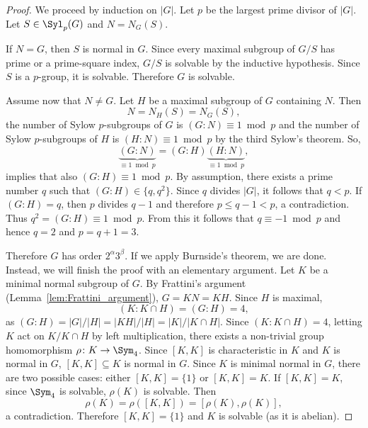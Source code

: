 \begin{proof}
We proceed by induction on $|G|$. Let $p$ be the largest prime divisor of $|G|$. Let 
$S\in\Syl_p(G)$ and $N=N_G(S)$. 

If $N=G$, then $S$ is normal in $G$. Since every 
maximal subgroup of $G/S$ has prime or a prime-square index, 
$G/S$ is solvable by the inductive hypothesis. Since $S$ is a $p$-group, it is solvable. 
Therefore $G$ is solvable. 

Assume now that $N\ne G$. Let $H$ be a maximal subgroup of $G$ containing $N$. Then 
\[
N=N_H(S)=N_G(S),
\]
the number of Sylow $p$-subgroups of $G$ is $(G:N)\equiv1\bmod p$  
and the number of Sylow $p$-subgroups of $H$ is $(H:N)\equiv1\bmod p$ 
by the third Sylow's theorem. So,
\[
\underbrace{(G:N)}_{\equiv1\bmod p} = (G:H)\underbrace{(H:N)}_{\equiv1\bmod p},
\]
implies that also $(G:H)\equiv1\bmod p$.
By assumption, there exists a prime number $q$ 
such that 
$(G:H)\in\{q,q^2\}$. Since $q$ divides $|G|$, it follows that $q<p$. If $(G:H)=q$, then 
$p$ divides $q-1$ and therefore $p\leq q-1<p$, a contradiction. Thus $q^2=(G:H)\equiv 1\bmod p$.
From this it follows that $q\equiv -1\bmod p$ and hence $q=2$ and 
$p=q+1=3$. 

Therefore $G$ has order $2^\alpha 3^ \beta$. 
If we apply Burnside's theorem, we are done. Instead, we will finish the proof with an elementary argument. Let $K$ be a minimal normal subgroup of $G$.
By Frattini's argument (Lemma~\ref{lem:Frattini_argument}),  $G=KN=KH$. Since $H$ is maximal, 
\[
(K:K\cap H) = (G:H)=4, 
\]
as $(G:H)=|G|/|H|=|KH|/|H|=|K|/|K\cap H|$. 
Since $(K:K\cap H)=4$, letting $K$ act on $K/K\cap H$ by left multiplication, there exists 
a non-trivial group homomorphism $\rho\colon K\to\Sym_4$. Since $[K,K]$ is characteristic in $K$ and $K$ is normal in $G$, $[K,K]\subseteq K$ is normal in $G$. Since $K$ is minimal normal in $G$, 
there are two possible cases: either $[K,K]=\{1\}$ or 
$[K,K]=K$. If $[K,K]=K$, 
since $\Sym_4$ is solvable, $\rho(K)$ is solvable. Then
\[
\rho(K)=\rho([K,K])=[\rho(K),\rho(K)],
\]
a contradiction. Therefore $[K,K]=\{1\}$ and $K$ is solvable (as it is abelian).
\end{proof}

